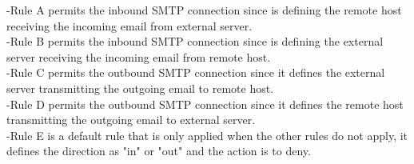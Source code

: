 \documentclass[12pt]{article}
\begin{document}
\begin{description}
\begin{enumerate}[a.]
        -Rule A permits the inbound SMTP connection since is defining the remote host receiving the incoming email from external server.\\
        -Rule B permits the inbound SMTP connection since is defining the external server receiving the incoming email from remote host. \\
        -Rule C permits the outbound SMTP connection since it defines the external server transmitting the outgoing email to remote host. \\
        -Rule D permits the outbound SMTP connection since it defines the remote host transmitting the outgoing email to external server. \\
        -Rule E is a default rule that is only applied when the other rules do not apply, it defines the direction as "in" or "out" and the action is to deny.  


\end{enumerate}
\end{description}
\end{document}
